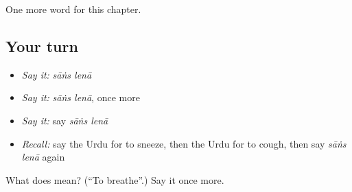 \begin{grammarlens}[title={What you've built}]
One more word for this chapter.
\end{grammarlens}

\subsection*{Your turn}
\begin{itemize}
\raggedright
  \item \emph{Say it:} \emph{sāṅs lenā}
  \item \emph{Say it:} \emph{sāṅs lenā}, once more
  \item \emph{Say it:} say \emph{sāṅs lenā}
  \item \emph{Recall:} say the Urdu for to sneeze, then the Urdu for to cough, then say \emph{sāṅs lenā} again
\end{itemize}

\begin{tcolorbox}[breakable,colback=teal!4,colframe=teal!35!black,title={Before you move on}]
What does   mean? (\textquotedblleft{}To breathe\textquotedblright{}.) Say it once more.
\end{tcolorbox}
